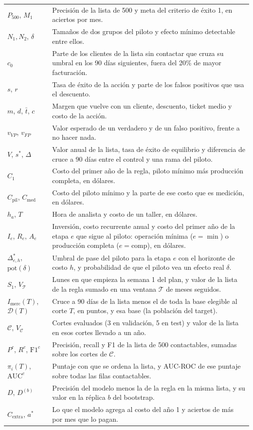 \documentclass[11pt,a4paper]{article}
\begin{document}
\begin{longtable}{@{}l p{10.7cm}@{}}
$P_{500}$, $M_1$ & Precisión de la lista de 500 y meta del criterio de éxito 1, en aciertos por mes. \\
$N_1, N_2$, $\delta$ & Tamaños de dos grupos del piloto y efecto mínimo detectable entre ellos. \\
$c_0$ & Parte de los clientes de la lista sin contactar que cruza su umbral en los 90 días siguientes, fuera del 20\% de mayor facturación. \\
$s$, $r$ & Tasa de éxito de la acción y parte de los falsos positivos que usa el descuento. \\
$m$, $d$, $\bar t$, $c$ & Margen que vuelve con un cliente, descuento, ticket medio y costo de la acción. \\
$v_{VP}$, $v_{FP}$ & Valor esperado de un verdadero y de un falso positivo, frente a no hacer nada. \\
$V$, $s^*$, $\Delta$ & Valor anual de la lista, tasa de éxito de equilibrio y diferencia de cruce a 90 días entre el control y una rama del piloto. \\
$C_1$ & Costo del primer año de la regla, piloto mínimo más producción completa, en dólares. \\
$C_{\text{pil}}$, $C_{\text{med}}$ & Costo del piloto mínimo y la parte de ese costo que es medición, en dólares. \\
$h_a$, $T$ & Hora de analista y costo de un taller, en dólares. \\
$I_e$, $R_e$, $A_e$ & Inversión, costo recurrente anual y costo del primer año de la etapa $e$ que sigue al piloto: operación mínima ($e=\min$) o producción completa ($e=\text{comp}$), en dólares. \\
$\Delta^{*}_{e,h}$, $\mathrm{pot}(\delta)$ & Umbral de pase del piloto para la etapa $e$ con el horizonte de costo $h$, y probabilidad de que el piloto vea un efecto real $\delta$. \\
$S_1$, $V_{\mathcal T}$ & Lunes en que empieza la semana 1 del plan, y valor de la lista de la regla sumado en una ventana $\mathcal T$ de meses seguidos. \\
$I_{\text{merc}}(T)$, $\mathcal D(T)$ & Cruce a 90 días de la lista menos el de toda la base elegible al corte $T$, en puntos, y esa base (la población del target). \\
$\mathcal C$, $V_{\mathcal C}$ & Cortes evaluados (3 en validación, 5 en test) y valor de la lista en esos cortes llevado a un año. \\
$P^{c}$, $R^{c}$, $\mathrm{F1}^{c}$ & Precisión, recall y F1 de la lista de 500 contactables, sumadas sobre los cortes de $\mathcal C$. \\
$\pi_i(T)$, $\mathrm{AUC}^{c}$ & Puntaje con que se ordena la lista, y AUC-ROC de ese puntaje sobre todas las filas contactables. \\
$D$, $D^{(b)}$ & Precisión del modelo menos la de la regla en la misma lista, y su valor en la réplica $b$ del bootstrap. \\
$C_{\text{extra}}$, $a^*$ & Lo que el modelo agrega al costo del año 1 y aciertos de más por mes que lo pagan. \\
\bottomrule
\end{longtable}
\end{document}
